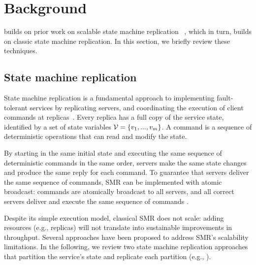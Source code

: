 \section{Background}
\label{sec:background}


\dynastar builds on
prior work on scalable state machine replication
~\cite{bezerra2014ssmr,hoang2016}, which in turn, builds on classic
state machine replication. In this section, we briefly review these
techniques. 

\subsection{State machine replication}
\label{sec:smr}

State machine replication is a fundamental approach to implementing fault-tolerant services by replicating servers, and coordinating the execution of client commands at replicas~\cite{Lam78,Sch90}. 
Every replica has a full copy of the service state, identified by a set of state variables $\mathcal{V} = \{v_1, ..., v_m\}$.
A command is a sequence of deterministic operations that can read and modify the state.

By starting in the same initial state and executing the same sequence of deterministic commands in the same order, servers make the same state changes and produce the same reply for each command. 
To guarantee that servers deliver the same sequence of commands, SMR can be implemented with atomic broadcast: commands are atomically broadcast to all servers, and all correct servers deliver and execute the same sequence of commands \cite{BJ87b,DSU04}.

Despite its simple execution model, classical SMR does not scale: adding resources (e.g., replicas) will not translate into sustainable improvements in throughput. 
%
Several approaches have been proposed to address SMR's scalability limitations. 
In the following, we review two state machine replication approaches that partition the service's state and replicate each partition (e.g., \cite{Glendenning:2011kj,hoang2016,Marandi:2011dj}).


